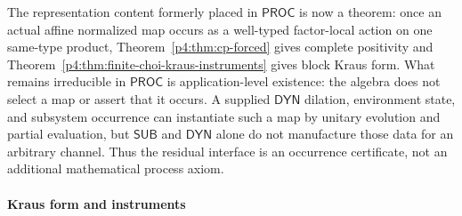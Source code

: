 \documentclass[12pt,a4paper]{article}
\begin{document}
\begin{remark}
\label{p4:rem:proc-relative-to-sub-dyn}
The representation content formerly placed in \(\mathsf{PROC}\) is now a
theorem: once an actual affine normalized map occurs as a well-typed
factor-local action on one same-type product,
Theorem~\ref{p4:thm:cp-forced} gives complete positivity and
Theorem~\ref{p4:thm:finite-choi-kraus-instruments} gives block Kraus form.
What remains irreducible in \(\mathsf{PROC}\) is application-level existence:
the algebra does not select a map or assert that it occurs.  A supplied
\(\mathsf{DYN}\) dilation, environment state, and subsystem occurrence can
instantiate such a map by unitary evolution and partial evaluation, but
\(\mathsf{SUB}\) and \(\mathsf{DYN}\) alone do not manufacture those data for
an arbitrary channel.  Thus the residual interface is an occurrence
certificate, not an additional mathematical process axiom.
\end{remark}




\paragraph{Kraus form and instruments}
\label{p4:sec:part1-kraus}
\end{document}
